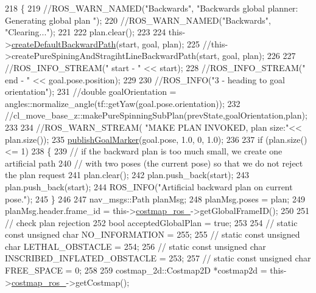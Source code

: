 \begin{DoxyCode}
218 \{
219     \textcolor{comment}{//ROS\_WARN\_NAMED("Backwards", "Backwards global planner: Generating global plan ");}
220     \textcolor{comment}{//ROS\_WARN\_NAMED("Backwards", "Clearing...");}
221 
222     plan.clear();
223 
224     this->\hyperlink{classcl__move__base__z_1_1backward__global__planner_1_1BackwardGlobalPlanner_a1b4d2eb717f9f63f2309def37c6ce297}{createDefaultBackwardPath}(start, goal, plan);
225     \textcolor{comment}{//this->createPureSpiningAndStragihtLineBackwardPath(start, goal, plan);}
226 
227     \textcolor{comment}{//ROS\_INFO\_STREAM(" start - " << start);}
228     \textcolor{comment}{//ROS\_INFO\_STREAM(" end - " << goal.pose.position);}
229 
230     \textcolor{comment}{//ROS\_INFO("3 - heading to goal orientation");}
231     \textcolor{comment}{//double goalOrientation = angles::normalize\_angle(tf::getYaw(goal.pose.orientation));}
232     \textcolor{comment}{//cl\_move\_base\_z::makePureSpinningSubPlan(prevState,goalOrientation,plan);}
233 
234     \textcolor{comment}{//ROS\_WARN\_STREAM( "MAKE PLAN INVOKED, plan size:"<< plan.size());}
235     \hyperlink{classcl__move__base__z_1_1backward__global__planner_1_1BackwardGlobalPlanner_a3c6784cad10fdadf28323380fe3d6d2b}{publishGoalMarker}(goal.pose, 1.0, 0, 1.0);
236 
237     \textcolor{keywordflow}{if} (plan.size() <= 1)
238     \{
239         \textcolor{comment}{// if the backward plan is too much small, we create one artificial path}
240         \textcolor{comment}{// with two poses (the current pose) so that we do not reject the plan request        }
241         plan.clear();
242         plan.push\_back(start);
243         plan.push\_back(start);
244         ROS\_INFO(\textcolor{stringliteral}{"Artificial backward plan on current pose."});
245     \}
246 
247     nav\_msgs::Path planMsg;
248     planMsg.poses = plan;
249     planMsg.header.frame\_id = this->\hyperlink{classcl__move__base__z_1_1backward__global__planner_1_1BackwardGlobalPlanner_a7103c15e6540a514acd421c3c6e194a4}{costmap\_ros\_}->getGlobalFrameID();
250 
251         \textcolor{comment}{// check plan rejection}
252     \textcolor{keywordtype}{bool} acceptedGlobalPlan = \textcolor{keyword}{true};
253 
254     \textcolor{comment}{// static const unsigned char NO\_INFORMATION = 255;}
255     \textcolor{comment}{// static const unsigned char LETHAL\_OBSTACLE = 254;}
256     \textcolor{comment}{// static const unsigned char INSCRIBED\_INFLATED\_OBSTACLE = 253;}
257     \textcolor{comment}{// static const unsigned char FREE\_SPACE = 0;}
258 
259     costmap\_2d::Costmap2D *costmap2d = this->\hyperlink{classcl__move__base__z_1_1backward__global__planner_1_1BackwardGlobalPlanner_a7103c15e6540a514acd421c3c6e194a4}{costmap\_ros\_}->getCostmap();

\end{DoxyCode}
